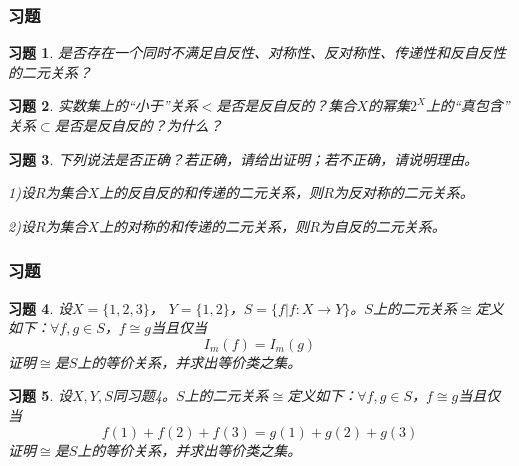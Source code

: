 \documentclass{beamer}
\newtheorem*{Exercise}{习题}
\begin{document}
\begin{CJK*}{UTF8}{gbsn}

\begin{frame}  
  \frametitle{习题}
  \begin{Exercise}
  是否存在一个同时不满足自反性、对称性、反对称性、传递性和反自反性的二元关系？    
  \end{Exercise}
  \begin{Exercise}
  实数集上的“小于”关系$<$是否是反自反的？集合$X$的幂集$2^X$上的“真包含”
  关系$\subset$是否是反自反的？为什么？    
  \end{Exercise}

  \begin{Exercise}
  下列说法是否正确？若正确，请给出证明；若不正确，请说明理由。
  
  1)设$R$为集合$X$上的反自反的和传递的二元关系，则$R$为反对称的二元关系。
  
  2)设$R$为集合$X$上的对称的和传递的二元关系，则$R$为自反的二元关系。    
  \end{Exercise}
\end{frame}
\begin{frame}  
  \frametitle{习题}

  \begin{Exercise}
  设$X = \{1,2,3\}$， $Y = \{1,2\}$，$S = \{f|f:X \to Y\}$。$S$上的二元关系$\cong$定义如下：$\forall f,g\in S$，$f \cong g$当且仅当\[I_m(f) = I_m(g)\]证明$\cong$是$S$上的等价关系，并求出等价类之集。    
  \end{Exercise}
  \begin{Exercise}
  设$X, Y, S$同习题4。$S$上的二元关系$\cong$定义如下：$\forall f,g\in S$，$f \cong g$当且仅当\[f(1) + f(2) + f(3) = g(1) + g(2) + g(3)\]证明$\cong$是$S$上的等价关系，并求出等价类之集。    
  \end{Exercise}

\end{frame}


\end{CJK*}
\end{document}
